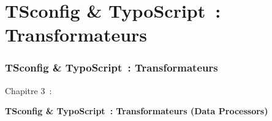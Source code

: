 %

\section{TSconfig \& TypoScript~: Transformateurs}
\begin{frame}[fragile]
	\frametitle{TSconfig \& TypoScript~: Transformateurs}

	\begin{center}\huge{Chapitre 3~:}\end{center}
	\begin{center}\huge{\color{typo3darkgrey}\textbf{TSconfig \& TypoScript~: Transformateurs (Data Processors)}}\end{center}

\end{frame}


